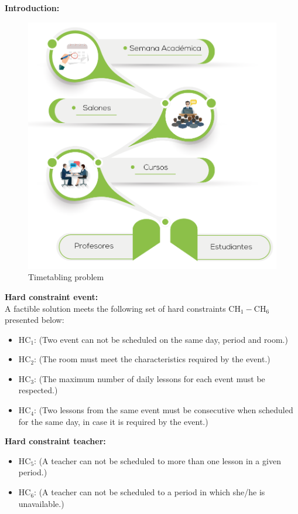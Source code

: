 \documentclass[centering]{report}
\newenvironment{slide}
    {\newpage
    \vspace*{\fill}
    }
    { 
     \vspace*{\fill}
    }
\begin{document}
\begin{slide}
\textbf{Introduction:}\\

\begin{figure}[h!]
  \centering
  \includegraphics[width=0.6\linewidth]{timetabling.png}
  \caption{\label{fig:timetabling}Timetabling problem}
\end{figure}

\end{slide}


\begin{slide}
\textbf{Hard constraint event:}\\

A factible solution meets the following set of hard constraints $ \mathrm{CH_{1}-CH_{6}} $ presented below:

\begin{itemize}
\item $\mathrm{HC_{1}}$: {\color{gray}(Two event can not be scheduled on the same day, period and room.)}
\item $\mathrm{HC_{2}}$: {\color{gray}(The room must meet the characteristics required by the event.)}
\item $\mathrm{HC_{3}}$: {\color{gray}(The maximum number of daily lessons for each event must be respected.)}
\item $\mathrm{HC_{4}}$: {\color{gray}(Two lessons from the same event must be consecutive when scheduled for the same  day, in case it is required by the event.)}
\end{itemize}

\end{slide}

\begin{slide}
\textbf{Hard constraint teacher:}\\

\begin{itemize}
\item $\mathrm{HC_{5}}$: {\color{gray}(A teacher can not be scheduled to more than one lesson in a given period.)}
\item $\mathrm{HC_{6}}$: {\color{gray}(A teacher can not be scheduled to a period in which she/he is unavailable.)}
\end{itemize}

\end{slide}
\end{document}
